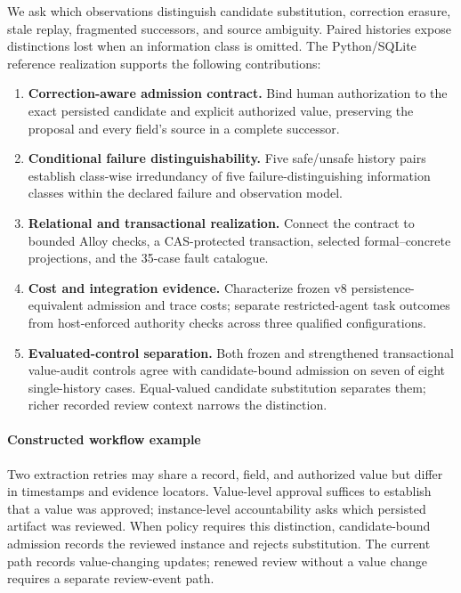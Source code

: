 We ask which observations distinguish candidate substitution, correction erasure, stale replay, fragmented successors, and source ambiguity. Paired histories expose distinctions lost when an information class is omitted. The Python/SQLite reference realization \system{} supports the following contributions:
\begin{enumerate}[label=\textbf{C\arabic*:},leftmargin=*]
\item \textbf{Correction-aware admission contract.} Bind human authorization to the exact persisted candidate and explicit authorized value, preserving the proposal and every field's source in a complete successor.
\item \textbf{Conditional failure distinguishability.} Five safe/unsafe history pairs establish class-wise irredundancy of five failure-distinguishing information classes within the declared failure and observation model.
\item \textbf{Relational and transactional realization.} Connect the contract to bounded Alloy checks, a CAS-protected transaction, selected formal--concrete projections, and the 35-case fault catalogue.
\item \textbf{Cost and integration evidence.} Characterize frozen v8 persistence-equivalent admission and trace costs; separate restricted-agent task outcomes from host-enforced authority checks across three qualified configurations.
\item \textbf{Evaluated-control separation.} Both frozen and strengthened transactional value-audit controls agree with candidate-bound admission on seven of eight single-history cases. Equal-valued candidate substitution separates them; richer recorded review context narrows the distinction.
\end{enumerate}

\paragraph{Constructed workflow example}
Two extraction retries may share a record, field, and authorized value but differ in timestamps and evidence locators. Value-level approval suffices to establish that a value was approved; instance-level accountability asks which persisted artifact was reviewed. When policy requires this distinction, candidate-bound admission records the reviewed instance and rejects substitution. The current path records value-changing updates; renewed review without a value change requires a separate review-event path.

